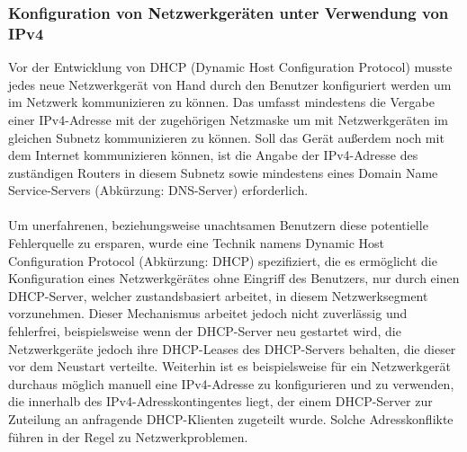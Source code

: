 \documentclass[a4paper,12pt]{scrartcl}
\begin{document}
\subsubsection{Konfiguration von Netzwerkger\"aten  unter Verwendung von IPv4}

Vor der Entwicklung von  DHCP (Dynamic Host Configuration Protocol)\cite{RFC2131} musste jedes neue Netzwerkger\"at von Hand durch den Benutzer konfiguriert werden um im Netzwerk kommunizieren zu k\"onnen. Das umfasst mindestens die Vergabe einer IPv4-Adresse mit der zugeh\"origen Netzmaske um mit Netzwerkgeräten im gleichen Subnetz kommunizieren zu können. Soll das Ger\"at au\ss{}erdem noch mit dem Internet kommunizieren k\"onnen, ist die Angabe der IPv4-Adresse des zuständigen Routers in diesem Subnetz sowie mindestens eines Domain Name Service-Servers (Abk\"urzung: DNS-Server) erforderlich.\\
\\
Um unerfahrenen, beziehungsweise unachtsamen Benutzern diese potentielle Fehlerquelle zu ersparen, wurde eine Technik namens Dynamic Host Configuration Protocol (Abk\"urzung: DHCP) spezifiziert, die es erm\"oglicht die Konfiguration eines Netzwerkg\"er\"ates ohne Eingriff des Benutzers, nur durch einen DHCP-Server, welcher zustandsbasiert arbeitet,  in diesem Netzwerksegment vorzunehmen. Dieser Mechanismus arbeitet jedoch nicht zuverlässig und fehlerfrei, beispielsweise wenn der DHCP-Server neu gestartet wird, die Netzwerkgeräte jedoch ihre DHCP-Leases des DHCP-Servers behalten, die dieser vor dem Neustart verteilte. Weiterhin ist es beispielsweise f\"ur ein Netzwerkger\"at durchaus m\"oglich manuell eine IPv4-Adresse zu konfigurieren und zu verwenden, die innerhalb des IPv4-Adresskontingentes liegt, der einem DHCP-Server zur Zuteilung an anfragende DHCP-Klienten zugeteilt wurde. Solche Adresskonflikte f\"uhren in der Regel zu Netzwerkproblemen.
\end{document}
